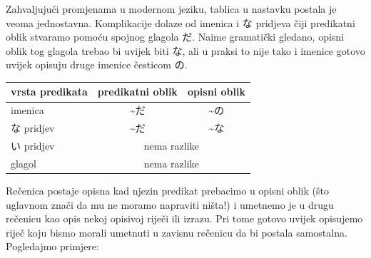 	
	
	Zahvaljujući promjenama u modernom jeziku, tablica u nastavku postala je veoma jednostavna. Komplikacije dolaze od imenica i な pridjeva čiji predikatni oblik stvaramo pomoću spojnog glagola だ. Naime gramatički gledano, opisni oblik tog glagola trebao bi uvijek biti な, ali u praksi to nije tako i imenice gotovo uvijek opisuju druge imenice česticom の\footnotemark[4].
	
	
	\begin{table}[h]
		\centering
		\begin{tabular}{l c c}\toprule[2pt]
			vrsta predikata & predikatni oblik & opisni oblik\\
			\midrule
			imenica & \textasciitilde だ & \textasciitilde の\\
			な pridjev & \textasciitilde だ & \textasciitilde な\\
			い pridjev & \multicolumn{2}{c}{nema razlike}\\
			glagol & \multicolumn{2}{c}{nema razlike}\\
			\bottomrule[2pt]
		\end{tabular}
	\end{table}

	
	Rečenica postaje opisna kad njezin predikat prebacimo u opisni oblik (što uglavnom znači da mu ne moramo napraviti ništa!) i umetnemo je u drugu rečenicu kao opis nekoj opisivoj riječi ili izrazu. Pri tome gotovo uvijek opisujemo riječ koju bismo morali umetnuti u zavisnu rečenicu da bi postala samostalna. Pogledajmo primjere:
	
	\begin{reibun}
	\end{reibun}

